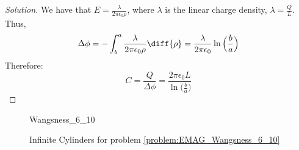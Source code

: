 \documentclass[crop=false,class=article,oneside]{standalone}
\begin{document}
        \begin{proof}[Solution]
            We have that
            $E=\frac{\lambda}{2\pi \epsilon_0 \rho}$,
            where $\lambda$
            is the linear charge density,
            $\lambda=\frac{Q}{L}$.
            Thus,
            \begin{equation*}
                \Delta\phi=-\int_{b}^{a}
                \frac{\lambda}{2\pi\epsilon_0\rho}\diff{\rho}
                =\frac{\lambda}{2\pi\epsilon_{0}}
                \ln\Big(\frac{b}{a}\Big)    
            \end{equation*}
            Therefore:
            \begin{equation*}
                C=\frac{Q}{\Delta\phi}
                =\frac{2\pi\epsilon_{0}L}
                      {\ln\big(\frac{b}{a}\big)}
            \end{equation*}
        \end{proof}
        \begin{figure}[H]
            \centering
            \captionsetup{type=figure}
            {Wangsness_6_10}
            \caption{%
                Infinite Cylinders for problem
                \ref{problem:EMAG_Wangsness_6_10}
            }
            \label{fig:EMAG_Wangsness_6_10}
        \end{figure}
\end{document}
